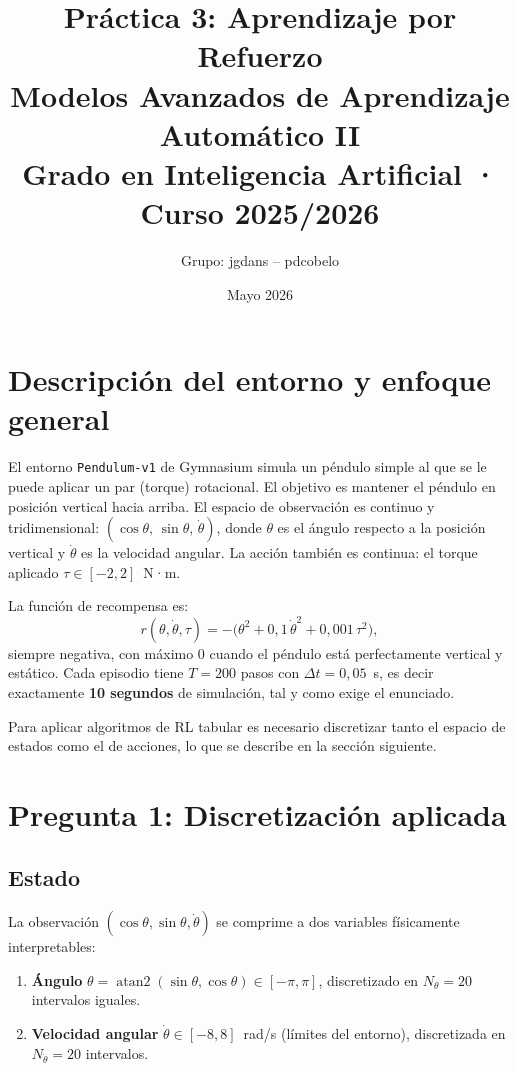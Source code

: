 \documentclass[12pt,a4paper]{article}
\title{%
  \textbf{Práctica 3: Aprendizaje por Refuerzo}\\[4pt]
  \large Modelos Avanzados de Aprendizaje Automático II\\
  Grado en Inteligencia Artificial · Curso 2025/2026
}
\author{Grupo: jgdans -- pdcobelo}
\date{Mayo 2026}
\begin{document}
\maketitle
\tableofcontents
\newpage

\section{Descripción del entorno y enfoque general}

El entorno \texttt{Pendulum-v1} de Gymnasium simula un péndulo simple al que se le
puede aplicar un par (torque) rotacional. El objetivo es mantener el péndulo en
posición vertical hacia arriba. El espacio de observación es continuo y tridimensional:
$(\cos\theta,\,\sin\theta,\,\dot\theta)$, donde $\theta$ es el ángulo respecto a la
posición vertical y $\dot\theta$ es la velocidad angular. La acción también es continua:
el torque aplicado $\tau \in [-2{,}2]$~N·m.

La función de recompensa es:
\[
  r(\theta,\dot\theta,\tau)
  = -\bigl(\theta^2 + 0{,}1\,\dot\theta^2 + 0{,}001\,\tau^2\bigr),
\]
siempre negativa, con máximo 0 cuando el péndulo está perfectamente vertical y estático.
Cada episodio tiene $T=200$ pasos con $\Delta t=0{,}05$~s, es decir exactamente
\textbf{10 segundos} de simulación, tal y como exige el enunciado.

Para aplicar algoritmos de RL tabular es necesario discretizar tanto el espacio de
estados como el de acciones, lo que se describe en la sección siguiente.

\section{Pregunta 1: Discretización aplicada}

\subsection{Estado}

La observación $(\cos\theta,\sin\theta,\dot\theta)$ se comprime a dos variables
físicamente interpretables:

\begin{enumerate}
  \item \textbf{Ángulo} $\theta = \operatorname{atan2}(\sin\theta,\cos\theta)
        \in [-\pi,\pi]$, discretizado en $N_\theta=20$ intervalos iguales.
  \item \textbf{Velocidad angular} $\dot\theta\in[-8,8]$~rad/s
        (límites del entorno), discretizada en $N_{\dot\theta}=20$ intervalos.
\end{enumerate}
\end{document}
